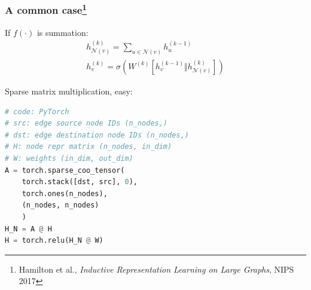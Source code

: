 \documentclass[11pt,aspectratio=169]{beamer}
\begin{document}
\begin{frame}
\begin{center}
		\end{center}
	\end{frame}

	\begin{frame}[fragile]
		\frametitle{A common case\footnote{Hamilton et al., \emph{Inductive Representation Learning on Large Graphs}, NIPS 2017}}
		\begin{minipage}{0.4\textwidth}
		If $f(\cdot)$ is summation:
		$$
		\begin{gathered}
		h_{\mathcal{N}(v)}^{(k)} =
		\sum_{u \in \mathcal{N}(v)} h^{(k-1)}_u \\
		h^{(k)}_v =
		\sigma \left( W^{(k)} \left[h_v^{(k-1)} \Vert h_{\mathcal{N}(v)}^{(k)}\right] \right)
		\end{gathered}
		$$
		\end{minipage}\hfill%
		\begin{minipage}{0.5\textwidth}
			Sparse matrix multiplication, easy:
\begin{lstlisting}[language=Python]
# code: PyTorch
# src: edge source node IDs (n_nodes,)
# dst: edge destination node IDs (n_nodes,)
# H: node repr matrix (n_nodes, in_dim)
# W: weights (in_dim, out_dim)
A = torch.sparse_coo_tensor(
    torch.stack([dst, src], 0),
    torch.ones(n_nodes),
    (n_nodes, n_nodes)
    )
H_N = A @ H
H = torch.relu(H_N @ W)
\end{lstlisting}
		\end{minipage}
	\end{frame}
\end{document}
